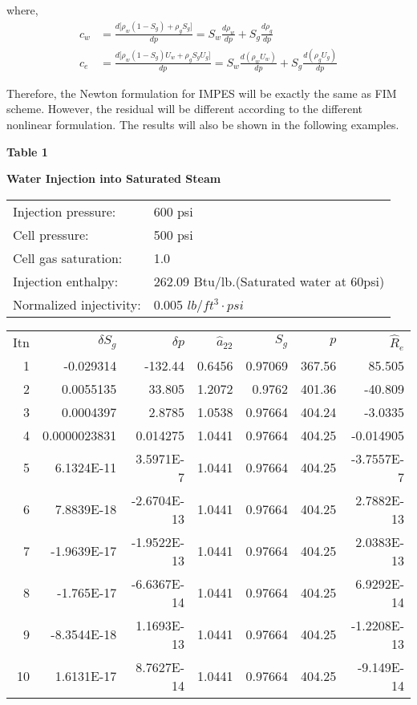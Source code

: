\documentclass[11pt]{article}
\begin{document}
    where,
    \[\begin{split}
    c_w &= \frac{d\big[\rho_w(1-S_g) + \rho_gS_g\big]}{dp}
          = S_w\frac{d\rho_w}{dp} + S_g\frac{d\rho_g}{dp} \\
    c_e &= \frac{d\big[\rho_w(1-S_g)U_w + \rho_gS_gU_g\big]}{dp}
          = S_w\frac{d(\rho_wU_w)}{dp} + S_g\frac{d(\rho_gU_g)}{dp}
    \end{split}\]

    Therefore, the Newton formulation for IMPES will be exactly the same as
    FIM scheme. However, the residual will be different according to the different
    nonlinear formulation. The results will also be shown in the following examples.
    
    \newpage

\centerline{\textbf{Table 1 }}
\centerline{\textbf{Water Injection into Saturated Steam}}
\vspace{20pt}

\begin{tabular}{ l l }
    Injection pressure: & 600 psi \\
    Cell pressure: & 500 psi \\
    Cell gas saturation: & 1.0 \\
    Injection enthalpy: & 262.09 Btu/lb.(Saturated water at 60psi) \\
    Normalized injectivity: & 0.005 $lb/ft^3\cdot psi$\\
\end{tabular}
\vspace{20pt}

\begin{table}[H]
\centering
\begin{tabular}{ r r r r r r r }
    Itn & $\delta S_g$ & $\delta p$ & $\hat{a}_{22}$ &
    $S_g$ & $p$ & $\hat{R}_e$ \\
    1 & -0.029314 & -132.44 & 0.6456 & 0.97069 & 367.56 & 85.505 \\
    2 & 0.0055135 & 33.805 & 1.2072 & 0.9762 & 401.36 & -40.809 \\
    3 & 0.0004397 & 2.8785 & 1.0538 & 0.97664 & 404.24 & -3.0335 \\
    4 & 0.0000023831 & 0.014275 & 1.0441 & 0.97664 & 404.25 & -0.014905 \\
    5 & 6.1324E-11 & 3.5971E-7 & 1.0441 & 0.97664 & 404.25 & -3.7557E-7 \\
    6 & 7.8839E-18 & -2.6704E-13 & 1.0441 & 0.97664 & 404.25 & 2.7882E-13 \\
    7 & -1.9639E-17 & -1.9522E-13 & 1.0441 & 0.97664 & 404.25 & 2.0383E-13 \\
    8 & -1.765E-17 & -6.6367E-14 & 1.0441 & 0.97664 & 404.25 & 6.9292E-14 \\
    9 & -8.3544E-18 & 1.1693E-13 & 1.0441 & 0.97664 & 404.25 & -1.2208E-13 \\
    10 & 1.6131E-17 & 8.7627E-14 & 1.0441 & 0.97664 & 404.25 & -9.149E-14 \\
\end{tabular}
\end{table}
\end{document}
